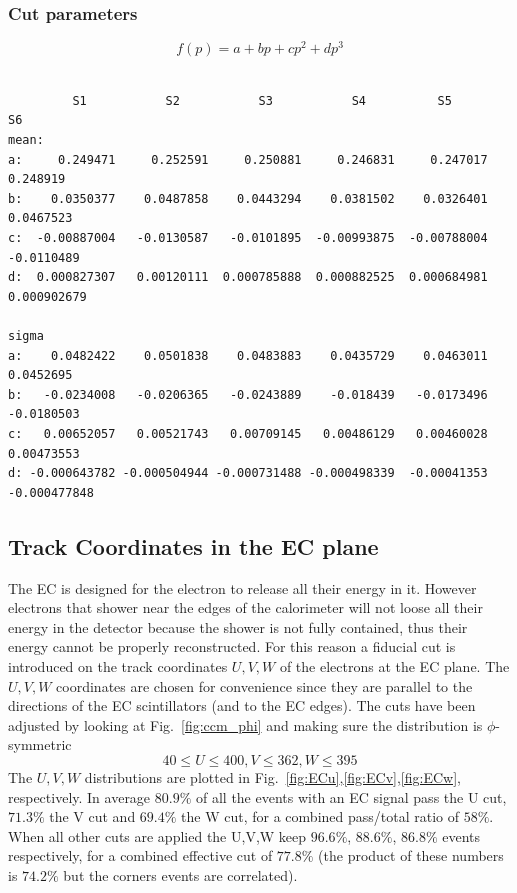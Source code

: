 \subsubsection{Cut parameters}\label{sec:ecp_parameters}
\vspace{1cm}
$$
f(p) = a + bp + cp^2 + dp^3
$$
\begin{verbatim}   

         S1           S2           S3           S4          S5            S6
mean:
a:     0.249471     0.252591     0.250881     0.246831     0.247017     0.248919
b:    0.0350377    0.0487858    0.0443294    0.0381502    0.0326401    0.0467523
c:  -0.00887004   -0.0130587   -0.0101895  -0.00993875  -0.00788004   -0.0110489
d:  0.000827307   0.00120111  0.000785888  0.000882525  0.000684981  0.000902679

sigma 
a:    0.0482422    0.0501838    0.0483883    0.0435729    0.0463011    0.0452695
b:   -0.0234008   -0.0206365   -0.0243889    -0.018439   -0.0173496   -0.0180503
c:   0.00652057   0.00521743   0.00709145   0.00486129   0.00460028   0.00473553
d: -0.000643782 -0.000504944 -0.000731488 -0.000498339  -0.00041353 -0.000477848
\end{verbatim}

\clearpage\newpage
\subsection{Track Coordinates in the EC plane}
The EC is designed for the electron to release all their energy in it.
However electrons that shower near the edges of the calorimeter will not loose
all their energy in the detector because the shower is not fully contained,
thus their energy cannot be properly reconstructed. For this reason 
a fiducial cut is introduced on the track coordinates $U,V,W$ 
of the electrons at the EC plane. The $U,V,W$ coordinates are chosen for 
convenience since they are parallel to the directions of the EC scintillators 
(and to the EC edges). The cuts have been adjusted by looking at Fig.~\ref{fig:ccm_phi}
and making sure the distribution is $\phi$-symmetric
$$
 40\leq U\leq400, V\leq362, W\leq395
$$
The $U,V,W$ distributions are plotted in Fig.~\ref{fig:ECu},\ref{fig:ECv},\ref{fig:ECw},
respectively. In average $80.9\%$ of all the events with an EC signal pass the U cut, $71.3\%$ the V cut
and $69.4\%$ the W cut, for a combined pass/total ratio of $58\%$.  When all other cuts are applied
the U,V,W keep $96.6\%$, $88.6\%$, $86.8\%$ events respectively, for a combined effective cut of $77.8\%$
(the product of these numbers is  $74.2\%$ but the corners events are correlated).


